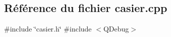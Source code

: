 \hypertarget{ihm-estock_2casier_8cpp}{}\subsection{Référence du fichier casier.\+cpp}
\label{ihm-estock_2casier_8cpp}
{\ttfamily \#include \char`\"{}casier.\+h\char`\"{}}\newline
{\ttfamily \#include $<$Q\+Debug$>$}\newline
